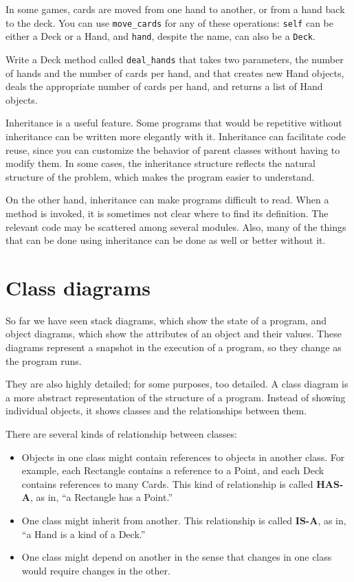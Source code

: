 In some games, cards are moved from one hand to another,
or from a hand back to the deck.  You can use \verb"move_cards"
for any of these operations: {\tt self} can be either a Deck
or a Hand, and {\tt hand}, despite the name, can also be a {\tt Deck}.

\begin{exercise}
Write a Deck method called \verb"deal_hands" that takes two
parameters, the number of hands and the number of cards per
hand, and that creates new Hand objects, deals the appropriate
number of cards per hand, and returns a list of Hand objects.
\end{exercise}

Inheritance is a useful feature.  Some programs that would be
repetitive without inheritance can be written more elegantly
with it.  Inheritance can facilitate code reuse, since you can
customize the behavior of parent classes without having to modify
them.  In some cases, the inheritance structure reflects the natural
structure of the problem, which makes the program easier to
understand.

On the other hand, inheritance can make programs difficult to read.
When a method is invoked, it is sometimes not clear where to find its
definition.  The relevant code may be scattered among several modules.
Also, many of the things that can be done using inheritance can be
done as well or better without it.  


\section{Class diagrams}

So far we have seen stack diagrams, which show the state of
a program, and object diagrams, which show the attributes
of an object and their values.  These diagrams represent a snapshot
in the execution of a program, so they change as the program
runs.

They are also highly detailed; for some purposes, too
detailed.  A class diagram is a more abstract representation
of the structure of a program.  Instead of showing individual
objects, it shows classes and the relationships between them.

There are several kinds of relationship between classes:

\begin{itemize}

\item Objects in one class might contain references to objects
in another class.  For example, each Rectangle contains a reference
to a Point, and each Deck contains references to many Cards.
This kind of relationship is called {\bf HAS-A}, as in, ``a Rectangle
has a Point.''

\item One class might inherit from another.  This relationship
is called {\bf IS-A}, as in, ``a Hand is a kind of a Deck.''

\item One class might depend on another in the sense that changes
in one class would require changes in the other.

\end{itemize}

